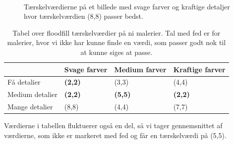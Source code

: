 \begin{figure}[!h]
    \centering
    \\
    \caption[]{Tærskelværdierne på et billede med svage farver og
	kraftige detaljer hvor tærskelværdien (8,8) passer bedst.}
    \label{Floodfillbilledet}
\end{figure}

\begin{table}[!h]
    \centering
    \begin{tabular}{| l | l | l | l |} \hline
        & Svage farver 		& Medium farver & Kraftige farver \\ \hline
        Få detalier 		& \textbf{(2,2)}	& (3,3)			& (4,4)\\ \hline
        Medium detalier 	& \textbf{(2,2)}	& \textbf{(5,5)}& \textbf{(2,2)}\\ \hline
        Mange detalier		& (8,8)				& (4,4)			& (7,7)\\ \hline
    \end{tabular}
    \caption{Tabel over floodfill tærskelværdier på ni malerier. Tal med
    fed er for malerier, hvor vi ikke har kunne finde en værdi, som
	passer godt nok til at kunne siges at passe.}
    \label{thressholdsTabelFF}
\end{table}

Værdierne i tabellen fluktuerer også en del, så vi tager
gennemsnittet af værdierne, som ikke er markeret med fed og får en tærskelværdi på (5,5).
